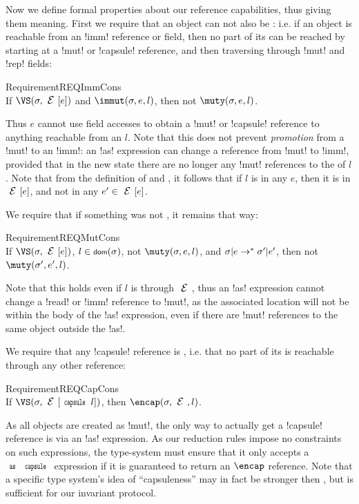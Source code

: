 Now we define formal properties about our reference capabilities, thus giving them meaning. First we require that
an \immut object can not also be \muty: i.e. if an object is reachable from an \Q!imm! reference or field, then no part of its \rog can be reached by starting at a \Q!mut! or \Q!capsule! reference, and then traversing through \Q!mut! and \Q!rep! fields:
\SS\begin{restatable}{Requirement}{REQImmCons}\ \\
	\indent If $\VS(\s, \E[e])$ and $\immut(\s, e, l)$, then not $\muty(\s, e, l)$.
\end{restatable}
\SS\noindent Thus $e$ cannot use field accesses to obtain a \Q!mut! or \Q!capsule! reference to anything reachable from an \immut $l$.
Note that this does not prevent \emph{promotion} from a \Q!mut! to an \Q!imm!: an \Q!as! expression can change a reference from \Q!mut! to \Q!imm!, provided that in the new state there are no longer any \Q!mut! references to the \rog of $l$. Note that from the definition of \muty and \immut, it follows that if $l$ is \immut in any $e$,
then it is \immut in $\E[e]$, and not \muty in any $e' \in \E[e]$.

\LS 

\noindent We require that if something was not \muty, it remains that way:%
\SS\begin{restatable}{Requirement}{REQMutCons}\ \\
	\indent If $\VS(\s, \E[e])$, $l \in \dom(\s)$, not $\muty(\s, e, l)$, and $\sigma|e \rightarrow^{*} \sigma'|e'$, then not $\muty(\s', e', l)$.
\end{restatable}
\SS\noindent Note that this holds even if $l$ is \muty through $\E$, thus an \Q!as! expression cannot change a \Q!read! or \Q!imm! reference to \Q!mut!, as the associated location will not be \muty within the body of the \Q!as! expression, even if there are \Q!mut! references to the same object outside the \Q!as!.

\LS

We require that any \Q!capsule! reference is \encap, i.e. that no \muty part of its \rog is reachable through any other reference:%
\SS\begin{restatable}{Requirement}{REQCapCons}\ \\
\indent If $\VS(\s,\E[\Kw{capsule}\,l])$, then $\encap(\s, \E, l)$.
\end{restatable}%
\SS\noindent As all objects are created as \Q!mut!, the only way to actually get a \Q!capsule! reference is via an \Q!as! expression.
As our reduction rules impose no constraints on such expressions, the type-system must ensure that it only accepts a $\Kw{as}\,\Kw{capsule}$ expression if it is guaranteed to 
return an $\encap$ reference. Note that a specific type system's idea of ``capsuleness'' may in fact be stronger then \encap, but \encap is sufficient for our invariant protocol.

